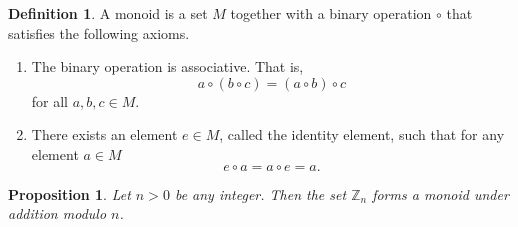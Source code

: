 \documentclass[10pt, titlepage]{amsart}
\newcommand\Z{{\mathbb Z}}
\newtheorem{prop}{Proposition}[subsection]
\theoremstyle{definition}
\newtheorem{definition}{Definition}[subsection]
\begin{document}
	\begin{definition}
		A monoid is a set $M$ together with a binary operation $\circ$ that satisfies the following axioms.
		\begin{enumerate}
			\item The binary operation is associative. That is, $$a \circ (b \circ c) = (a \circ b) \circ c$$ for all $a, b, c \in M$.
			\item There exists an element $e \in M$, called the identity element, such that for any element $a \in M$ $$e \circ a = a \circ e = a.$$ 
		\end{enumerate}
	\end{definition}
	
	\begin{prop}\label{proposition:Zn_is_a_monoid_under_addition}
		Let $n>0$ be any integer. Then the set $\Z_n$ forms a monoid under addition modulo $n$.
	\end{prop}
	
\end{document}
